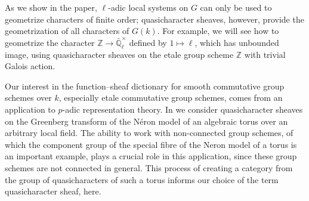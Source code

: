 \documentclass{amsart}
\theoremstyle{plain}
\theoremstyle{definition}
\theoremstyle{remark}
\newcommand{\ZZ}{{\mathbb{Z}}}
\newcommand{\EE}{\mathbb{\bar Q}_\ell}
\newcommand{\Fq}{k}
\newcommand{\EEx}{\EE^\times}
\newcommand{\Frob}[1]{\operatorname{F}_{#1}}
\begin{document}

As we show in the paper, $\ell$-adic local systems on $G$ can only be used to geometrize characters of finite order; quasicharacter sheaves, however, provide the geometrization of all characters of $G(\Fq)$.
For example, we will see how to geometrize the character $\ZZ \to \EEx$ defined by
$1 \mapsto \ell$, which has unbounded image,
using quasicharacter sheaves on the etale group scheme $\ZZ$ with trivial Galois action.


Our interest in the function--sheaf dictionary for smooth commutative group schemes over $\Fq$, especially etale commutative group schemes, comes from an application to $p$-adic representation theory.
In \cite{cunningham-roe:13a} we consider quasicharacter sheaves on the
Greenberg transform of the N\'eron model of an algebraic torus over an arbitrary local field.
The ability to work with non-connected group schemes,
of which the component group of the special fibre of the Neron model of a torus is an important example,
plays a crucial role in this application,
since these group schemes are not connected in general.
This process of creating a category from the group of quasicharacters of such a torus
informs our choice of the term quasicharacter sheaf, here.

\end{document}
